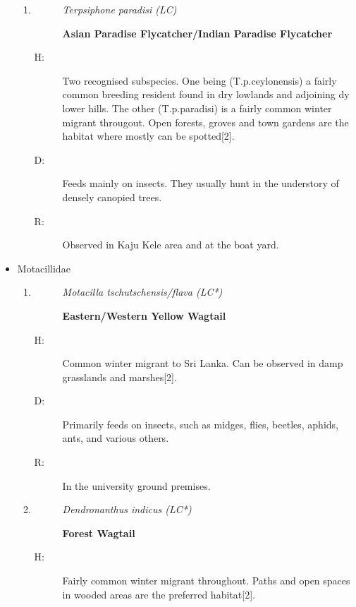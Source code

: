 \begin{itemize}
\begin{enumerate}
\item%
\begin{description}%
\item[]%
\textit{Terpsiphone paradisi (LC)}%
\item[]%
\textbf{Asian Paradise Flycatcher/Indian Paradise Flycatcher}%
\end{description}%
\begin{description}%
\item[H: ]%
Two recognised subspecies. One being (T.p.ceylonensis) a fairly common breeding resident found in dry lowlands and adjoining dy lower hills. The other (T.p.paradisi) is a fairly common winter migrant througout. Open forests, groves and town gardens are the habitat where mostly can be spotted{[}2{]}.%
\item[D: ]%
Feeds mainly on insects.  They usually hunt in the understory of densely canopied trees.%
\item[R: ]%
Observed in Kaju Kele area and at the boat yard.%
\end{description}%
\end{enumerate}%
\item%
Motacillidae%
\begin{enumerate}%
\item%
\begin{description}%
\item[]%
\textit{Motacilla tschutschensis/flava (LC*)}%
\item[]%
\textbf{Eastern/Western Yellow Wagtail}%
\end{description}%
\begin{description}%
\item[H: ]%
Common winter migrant to Sri Lanka. Can be observed in damp grasslands and marshes{[}2{]}.%
\item[D: ]%
Primarily feeds on insects, such as midges, flies, beetles, aphids, ants, and various others.%
\item[R: ]%
In the university ground premises.%
\end{description}%
\item%
\begin{description}%
\item[]%
\textit{Dendronanthus indicus (LC*)}%
\item[]%
\textbf{Forest Wagtail}%
\end{description}%
\begin{description}%
\item[H: ]%
Fairly common winter migrant throughout. Paths and open spaces in wooded areas are the preferred habitat{[}2{]}.%

\end{description}
\end{enumerate}
\end{itemize}
